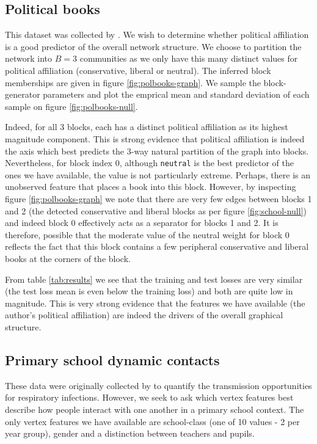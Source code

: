 \subsection{Political books}

This dataset was collected by \citet{polbooks}. We wish to determine whether political affiliation is a good predictor of the overall network structure. We choose to partition the network into $B=3$ communities as we only have this many distinct values for political affiliation (conservative, liberal or neutral). The inferred block memberships are given in figure \ref{fig:polbooks-graph}. We sample the block-generator parameters and plot the emprical mean and standard deviation of each sample on figure \ref{fig:polbooks-null}.

Indeed, for all 3 blocks, each has a distinct political affiliation as its highest magnitude component. This is strong evidence that political affiliation is indeed the axis which best predicts the 3-way natural partition of the graph into blocks. Nevertheless, for block index 0, although \verb*|neutral| is the best predictor of the ones we have available, the value is not particularly extreme. Perhaps, there is an unobserved feature that places a book into this block. However, by inspecting figure \ref{fig:polbooks-graph} we note that there are very few edges between blocks 1 and 2 (the detected conservative and liberal blocks as per figure \ref{fig:school-null}) and indeed block 0 effectively acts as a separator for blocks 1 and 2. It is therefore, possible that the moderate value of the neutral weight for block 0 reflects the fact that this block contains a few peripheral conservative and liberal books at the corners of the block.

From table \ref{tab:results} we see that the training and test losses are very similar (the test loss mean is even below the training loss) and both are quite low in magnitude. This is very strong evidence that the features we have available (the author's political affiliation) are indeed the drivers of the overall graphical structure.

\subsection{Primary school dynamic contacts}

These data were originally collected by \citet{schools} to quantify the transmission opportunities for respiratory infections. However, we seek to ask which vertex features best describe how people interact with one another in a primary school context. The only vertex features we have available are school-class (one of 10 values - 2 per year group), gender and a distinction between teachers and pupils.

